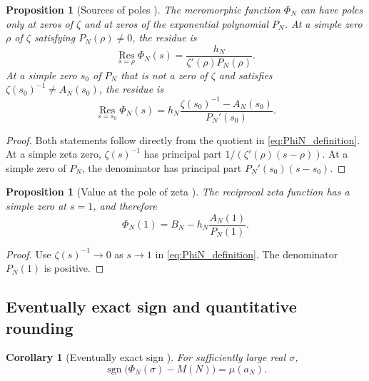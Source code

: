 \documentclass[11pt]{amsart}
\numberwithin{equation}{section}
\theoremstyle{plain}
\newtheorem{proposition}[theorem]{Proposition}
\newtheorem{corollary}[theorem]{Corollary}
\theoremstyle{definition}
\theoremstyle{remark}
\newcommand{\1}{\mathbf{1}}
\begin{document}
\begin{proposition}[Sources of poles {}]
\label{prop:sources_of_poles}
The meromorphic function $\Phi_N$ can have poles only at zeros of $\zeta$
and at zeros of the exponential polynomial $P_N$.  At a simple zero $\rho$
of $\zeta$ satisfying $P_N(\rho)\neq0$, the residue is
\begin{equation}
\operatorname*{Res}_{s=\rho}\Phi_N(s)
=
\frac{h_N}{\zeta'(\rho)P_N(\rho)}.
\label{eq:Phi_residue_zeta_zero}
\end{equation}
At a simple zero $s_0$ of $P_N$ that is not a zero of $\zeta$ and satisfies
$\zeta(s_0)^{-1}\neq A_N(s_0)$, the residue is
\begin{equation}
\operatorname*{Res}_{s=s_0}\Phi_N(s)
=
h_N\frac{\zeta(s_0)^{-1}-A_N(s_0)}{P_N'(s_0)}.
\label{eq:Phi_residue_P_zero}
\end{equation}
\end{proposition}

\begin{proof}
Both statements follow directly from the quotient in
\eqref{eq:PhiN_definition}.  At a simple zeta zero,
$\zeta(s)^{-1}$ has principal part
$1/(\zeta'(\rho)(s-\rho))$.  At a simple zero of $P_N$, the denominator has
principal part $P_N'(s_0)(s-s_0)$.
\end{proof}


\begin{proposition}[Value at the pole of zeta {}]
\label{prop:Phi_at_one}
The reciprocal zeta function has a simple zero at $s=1$, and therefore
\begin{equation}
\Phi_N(1)
=
B_N-h_N\frac{A_N(1)}{P_N(1)}.
\label{eq:Phi_at_one}
\end{equation}
\end{proposition}

\begin{proof}
Use $\zeta(s)^{-1}\to0$ as $s\to1$ in
\eqref{eq:PhiN_definition}.  The denominator $P_N(1)$ is positive.
\end{proof}

\subsection{Eventually exact sign and quantitative rounding}
\label{subsec:eventual_sign_rounding}


\begin{corollary}[Eventually exact sign {}]
\label{cor:eventual_sign}
For sufficiently large real $\sigma$,
\begin{equation}
\operatorname{sgn}\bigl(\Phi_N(\sigma)-M(N)\bigr)
=
\mu(a_N).
\label{eq:eventual_sign}
\end{equation}
\end{corollary}
\end{document}
